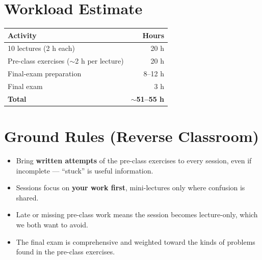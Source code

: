 \documentclass[11pt]{article}
\begin{document}
\section*{Workload Estimate}

\begin{center}
\begin{tabular}{lr}
\toprule
\textbf{Activity} & \textbf{Hours} \\
\midrule
10 lectures (2 h each)                 & 20 h \\
Pre-class exercises ($\sim$2 h per lecture) & 20 h \\
Final-exam preparation                 & 8--12 h \\
Final exam                             & 3 h \\
\midrule
\textbf{Total} & \textbf{$\sim$51--55 h} \\
\bottomrule
\end{tabular}
\end{center}

\section*{Ground Rules (Reverse Classroom)}

\begin{itemize}[leftmargin=*]
  \item Bring \textbf{written attempts} of the pre-class exercises to every session, even if incomplete --- ``stuck'' is useful information.
  \item Sessions focus on \textbf{your work first}, mini-lectures only where confusion is shared.
  \item Late or missing pre-class work means the session becomes lecture-only, which we both want to avoid.
  \item The final exam is comprehensive and weighted toward the kinds of problems found in the pre-class exercises.
\end{itemize}
\end{document}
